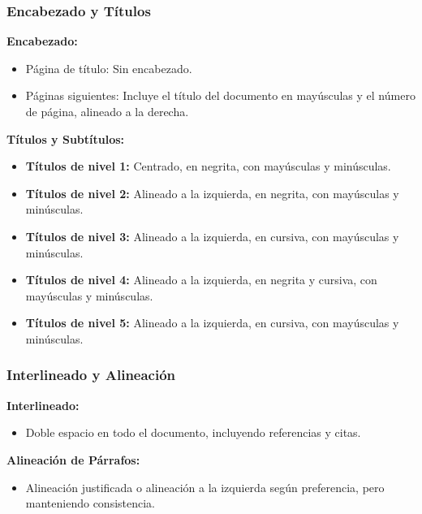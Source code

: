 \documentclass[
11pt, %
]{beamer}
\begin{document}
\begin{frame}
	\frametitle{Encabezado y Títulos}

	\textbf{Encabezado:}
	\begin{itemize}
		\item Página de título: Sin encabezado.
		\item Páginas siguientes: Incluye el título del documento en mayúsculas y el número de página, alineado a la derecha.
	\end{itemize}

	\textbf{Títulos y Subtítulos:}
	\begin{itemize}
		\item \textbf{Títulos de nivel 1:} Centrado, en negrita, con mayúsculas y minúsculas.
		\item \textbf{Títulos de nivel 2:} Alineado a la izquierda, en negrita, con mayúsculas y minúsculas.
		\item \textbf{Títulos de nivel 3:} Alineado a la izquierda, en cursiva, con mayúsculas y minúsculas.
		\item \textbf{Títulos de nivel 4:} Alineado a la izquierda, en negrita y cursiva, con mayúsculas y minúsculas.
		\item \textbf{Títulos de nivel 5:} Alineado a la izquierda, en cursiva, con mayúsculas y minúsculas.
	\end{itemize}

\end{frame}

\begin{frame}
	\frametitle{Interlineado y Alineación}

	\textbf{Interlineado:}
	\begin{itemize}
		\item Doble espacio en todo el documento, incluyendo referencias y citas.
	\end{itemize}

	\textbf{Alineación de Párrafos:}
	\begin{itemize}
		\item Alineación justificada o alineación a la izquierda según preferencia, pero manteniendo consistencia.
	\end{itemize}

\end{frame}
\end{document}
